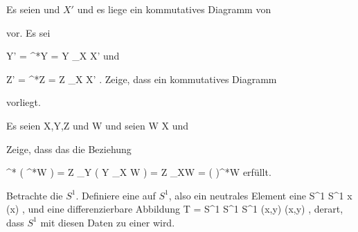 {}
{

Es seien
 und $X'$
und es liege ein kommutatives Diagramm von

 {  }

vor. Es sei

\mavergleichskette
{\vergleichskette
{ Y'
}
{ = }{ \varphi^*Y
}
{ = }{ Y \times_X X'
}
{    }{
}
{   }{
}
}
{}{}{}
und

\mavergleichskette
{\vergleichskette
{ Z'
}
{ = }{ \varphi^*Z
}
{ = }{ Z \times_X X'
}
{    }{
}
{   }{
}
}
{}{}{.}
Zeige, dass ein kommutatives Diagramm

 {  }

vorliegt.

}
{} {}

{}
{

Es seien
\mathkor {} {X,Y,Z} {und} {W} {}
und seien
\maabb {} { W } { X
} {}
und

 {  }

Zeige, dass das
 {} {}
die Beziehung

\mavergleichskettedisp
{\vergleichskette
{ \varphi^* \left(  \psi^*W  \right)
}
{ =} { Z \times_Y \left(  Y \times_X W  \right)
}
{ =} { Z \times_XW
}
{ =} { ( \psi \circ \varphi)^*W
}
{ } {
}
}
{}{}{}
erfüllt.

}
{} {}

{}
{

Betrachte die
$S^1$. Definiere eine  {} auf $S^1$, also ein neutrales Element
 eine
\maabbeledisp {\alpha} {S^1} {S^1
} { x } { \alpha (x)
} {,}
und eine differenzierbare Abbildung
\maabbeledisp {} {T = S^1 \times S^1} {S^1
} {(x,y)} { \varphi(x,y)
} {,}
derart, dass $S^1$ mit diesen Daten zu einer
wird.

}
{} {}

